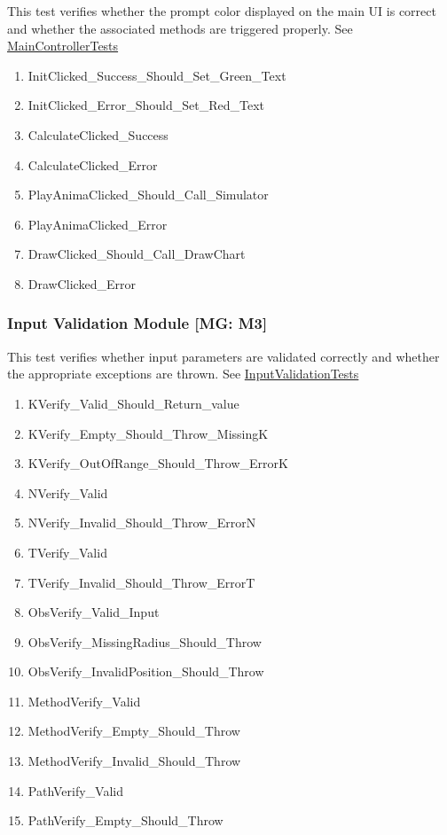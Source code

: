 \documentclass[12pt, titlepage]{article}
\begin{document}
This test verifies whether the prompt color displayed on the main UI is correct 
and whether the associated methods are triggered properly.
See \href{https://github.com/Mei0725/FlockingSimulator/blob/main/src/Assets/Tests/MainControllerTests.cs}{MainControllerTests}
\begin{enumerate}
  \item InitClicked\_Success\_Should\_Set\_Green\_Text
  \item InitClicked\_Error\_Should\_Set\_Red\_Text
  \item CalculateClicked\_Success
  \item CalculateClicked\_Error
  \item PlayAnimaClicked\_Should\_Call\_Simulator
  \item PlayAnimaClicked\_Error
  \item DrawClicked\_Should\_Call\_DrawChart
  \item DrawClicked\_Error
\end{enumerate}

\subsubsection{Input Validation Module [MG: M3]} \label{UTInputValid}

This test verifies whether input parameters are validated correctly and whether 
the appropriate exceptions are thrown.
See \href{https://github.com/Mei0725/FlockingSimulator/blob/main/src/Assets/Tests/IO/InputValidationTests.cs}{InputValidationTests}
\begin{enumerate}
  \item KVerify\_Valid\_Should\_Return\_value
  \item KVerify\_Empty\_Should\_Throw\_MissingK
  \item KVerify\_OutOfRange\_Should\_Throw\_ErrorK
  \item NVerify\_Valid
  \item NVerify\_Invalid\_Should\_Throw\_ErrorN
  \item TVerify\_Valid
  \item TVerify\_Invalid\_Should\_Throw\_ErrorT
  \item ObsVerify\_Valid\_Input
  \item ObsVerify\_MissingRadius\_Should\_Throw
  \item ObsVerify\_InvalidPosition\_Should\_Throw
  \item MethodVerify\_Valid
  \item MethodVerify\_Empty\_Should\_Throw
  \item MethodVerify\_Invalid\_Should\_Throw
  \item PathVerify\_Valid
  \item PathVerify\_Empty\_Should\_Throw
\end{enumerate}
\end{document}
